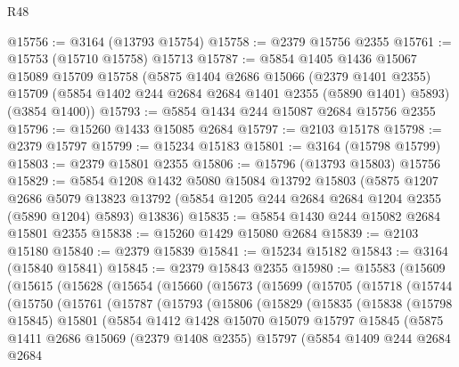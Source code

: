 \begin{lexlean}{R48}
\begin{coremodule}
@15756 := @3164 (@13793 @15754)
@15758 := @2379 @15756 @2355
@15761 := @15753 (@15710 @15758) @15713
@15787 := @5854
    @1405
    @1436
    @15067
    @15089
    @15709
    @15758
    (@5875
      @1404
      @2686
      @15066
      (@2379 @1401 @2355)
      @15709
      (@5854 @1402 @244 @2684 @2684 @1401 @2355 (@5890 @1401) @5893)
      (@3854 @1400))
@15793 := @5854 @1434 @244 @15087 @2684 @15756 @2355
@15796 := @15260 @1433 @15085 @2684
@15797 := @2103 @15178
@15798 := @2379 @15797
@15799 := @15234 @15183
@15801 := @3164 (@15798 @15799)
@15803 := @2379 @15801 @2355
@15806 := @15796 (@13793 @15803) @15756
@15829 := @5854
    @1208
    @1432
    @5080
    @15084
    @13792
    @15803
    (@5875
      @1207
      @2686
      @5079
      @13823
      @13792
      (@5854 @1205 @244 @2684 @2684 @1204 @2355 (@5890 @1204) @5893)
      @13836)
@15835 := @5854 @1430 @244 @15082 @2684 @15801 @2355
@15838 := @15260 @1429 @15080 @2684
@15839 := @2103 @15180
@15840 := @2379 @15839
@15841 := @15234 @15182
@15843 := @3164 (@15840 @15841)
@15845 := @2379 @15843 @2355
@15980 := @15583
    (@15609
      (@15615
        (@15628
          (@15654
            (@15660
              (@15673
                (@15699
                  (@15705
                    (@15718
                      (@15744
                        (@15750
                          (@15761
                            (@15787
                              (@15793
                                (@15806
                                  (@15829
                                    (@15835
                                      (@15838
                                        (@15798 @15845)
                                        @15801
                                        (@5854
                                          @1412
                                          @1428
                                          @15070
                                          @15079
                                          @15797
                                          @15845
                                          (@5875
                                            @1411
                                            @2686
                                            @15069
                                            (@2379 @1408 @2355)
                                            @15797
                                            (@5854
                                              @1409
                                              @244
                                              @2684
                                              @2684

\end{coremodule}
\end{lexlean}

